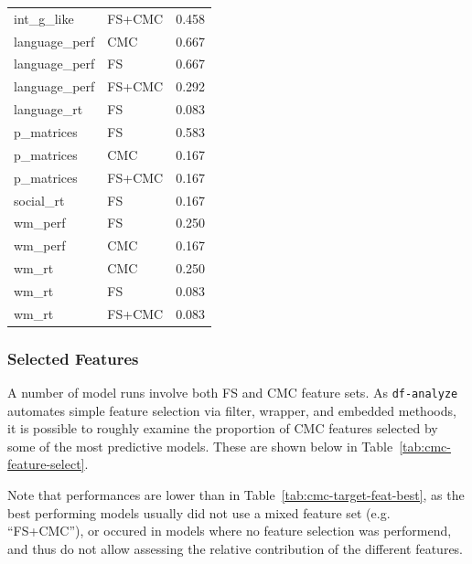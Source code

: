 \documentclass{article}
\begin{document}
\begin{longtable}{llr}
	int\_g\_like & FS+CMC & 0.458 \\
	language\_perf & CMC & 0.667 \\
	language\_perf & FS & 0.667 \\
	\vspace{0.2cm}
	language\_perf & FS+CMC & 0.292 \\
	\vspace{0.2cm}
	language\_rt & FS & 0.083 \\
	p\_matrices & FS & 0.583 \\
	p\_matrices & CMC & 0.167 \\
	\vspace{0.2cm}
	p\_matrices & FS+CMC & 0.167 \\
	\vspace{0.2cm}
	social\_rt & FS & 0.167 \\
	wm\_perf & FS & 0.250 \\
	\vspace{0.2cm}
	wm\_perf & CMC & 0.167 \\
	wm\_rt & CMC & 0.250 \\
	wm\_rt & FS & 0.083 \\
	wm\_rt & FS+CMC & 0.083 \\
	\end{longtable}

\subsubsection{Selected Features}

A number of model runs involve both FS and CMC feature sets. As \texttt{df-analyze}
automates simple feature selection via filter, wrapper, and embedded
methoods, it is possible to roughly examine the proportion of CMC features
selected by some of the most predictive models. These are shown below in
Table~\ref{tab:cmc-feature-select}.

Note that performances are lower than in
Table~\ref{tab:cmc-target-feat-best}, as the best performing models usually
did not use a mixed feature set (e.g. ``FS+CMC''), or occured in models where
no feature selection was performend, and thus do not allow assessing the
relative contribution of the different features.
\end{document}
